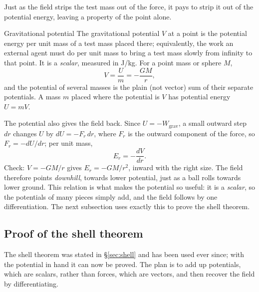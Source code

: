 Just as the field strips the test mass out of the force, it pays to strip it out of the potential energy,
leaving a property of the point alone.

\begin{defbox}{Gravitational potential}
The gravitational potential $V$ at a point is the potential energy per unit mass of a test mass placed
there; equivalently, the work an external agent must do per unit mass to bring a test mass slowly from
infinity to that point. It is a \emph{scalar}, measured in \si{J/kg}. For a point mass or sphere $M$,
\[
V=\frac{U}{m}=-\frac{GM}{r},
\]
and the potential of several masses is the plain (not vector) sum of their separate potentials. A mass
$m$ placed where the potential is $V$ has potential energy $U=mV$.
\end{defbox}

The potential also gives the field back. Since $U=-W_{\text{grav}}$, a small outward step $dr$ changes
$U$ by $dU=-F_r\,dr$, where $F_r$ is the outward component of the force, so $F_r=-dU/dr$; per unit mass,
\[
E_r=-\frac{dV}{dr}.
\]
Check: $V=-GM/r$ gives $E_r=-GM/r^2$, inward with the right size. The field therefore points
\emph{downhill}, towards lower potential, just as a ball rolls towards lower ground. This relation is what makes the
potential so useful: it is a \emph{scalar}, so the potentials of many pieces simply add, and the field
follows by one differentiation. The next subsection uses exactly this to prove the shell theorem.

\subsection{Proof of the shell theorem}\label{sec:shellproof}

The shell theorem was stated in \S\ref{sec:shell} and has been used ever since; with the potential in
hand it can now be proved. The plan is to add up potentials, which are scalars, rather than forces,
which are vectors, and then recover the field by differentiating.

\begin{figure}[htbp]
\centering
{}
\end{figure}

